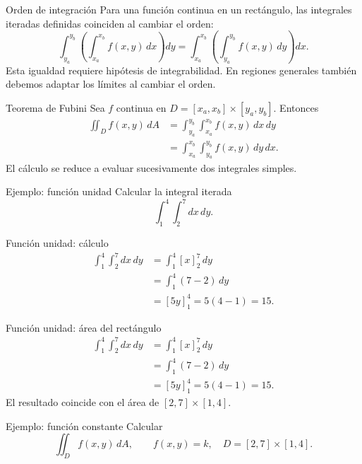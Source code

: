\documentclass[original_version/main.tex]{subfiles}
\begin{document}
\begin{frame}{Orden de integración}
Para una función continua en un rectángulo, las integrales iteradas definidas coinciden al cambiar el orden:\[\int_{y_a}^{y_b}\!\left(\int_{x_a}^{x_b}f(x,y)\,dx\right)dy=\int_{x_a}^{x_b}\!\left(\int_{y_a}^{y_b}f(x,y)\,dy\right)dx.\]Esta igualdad requiere hipótesis de integrabilidad. En regiones generales también debemos adaptar los límites al cambiar el orden.
\end{frame}

\begin{frame}{Teorema de Fubini}
\small Sea $f$ continua en $D=[x_a,x_b]\times[y_a,y_b]$. Entonces\begin{align*}\iint_D f(x,y)\,dA&=\int_{y_a}^{y_b}\int_{x_a}^{x_b}f(x,y)\,dx\,dy\\&=\int_{x_a}^{x_b}\int_{y_a}^{y_b}f(x,y)\,dy\,dx.\end{align*}El cálculo se reduce a evaluar sucesivamente dos integrales simples.
\end{frame}

\begin{frame}{Ejemplo: función unidad}
Calcular la integral iterada\[\int_1^4\int_2^7dx\,dy.\]
\end{frame}

\begin{frame}{Función unidad: cálculo}
\begin{align*}\int_1^4\int_2^7dx\,dy&=\int_1^4[x]_2^7\,dy\\&=\int_1^4(7-2)\,dy\\&=[5y]_1^4=5(4-1)=15.\end{align*}
\end{frame}

\begin{frame}{Función unidad: área del rectángulo}
\small \begin{align*}\int_1^4\int_2^7dx\,dy&=\int_1^4[x]_2^7\,dy\\&=\int_1^4(7-2)\,dy\\&=[5y]_1^4=5(4-1)=15.\end{align*}El resultado coincide con el área de $[2,7]\times[1,4]$.
\end{frame}

\begin{frame}{Ejemplo: función constante}
Calcular\[\iint_D f(x,y)\,dA,\qquad f(x,y)=k,\quad D=[2,7]\times[1,4].\]
\end{frame}
\end{document}
